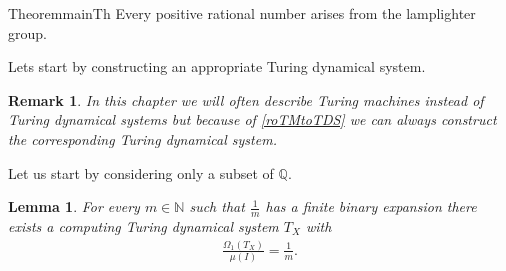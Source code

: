 \documentclass[12pt,a4paper]{scrartcl}
\theoremstyle{plain}
\newtheorem{Lemma}[Theorem]{Lemma}
\newtheorem{Remark}[Theorem]{Remark}
\theoremstyle{definition}
\newcommand{\Q}{\mathbb{Q}} %
\newcommand{\N}{\mathbb{N}} %
\newcommand{\2}{\mathbb{Z} / 2 \mathbb{Z}}
\newcommand{\1}{\bar{1}}
\newcommand{\0}{\bar{0}}
\begin{document}
\begin{restatable}{Theorem}{mainTh} \label{mainTh}
	Every positive rational number arises from the lamplighter group.
\end{restatable}
Lets start by constructing an appropriate Turing dynamical system. 
\begin{Remark}
	In this chapter we will often describe Turing machines instead of Turing dynamical systems but because of \ref{roTMtoTDS} we can always construct the corresponding Turing dynamical system.
\end{Remark}
Let us start by considering only a subset of $\Q$.
\begin{Lemma} \label{1TM}
	For every $m \in \N$ such that $\frac{1}{m}$ has a finite binary expansion there exists a computing Turing dynamical system $T_X$ with
	\begin{align*}
		\frac{\Omega_1(T_X)}{\mu(I)} = \frac{1}{m}.
	\end{align*}
\end{Lemma}
\end{document}
